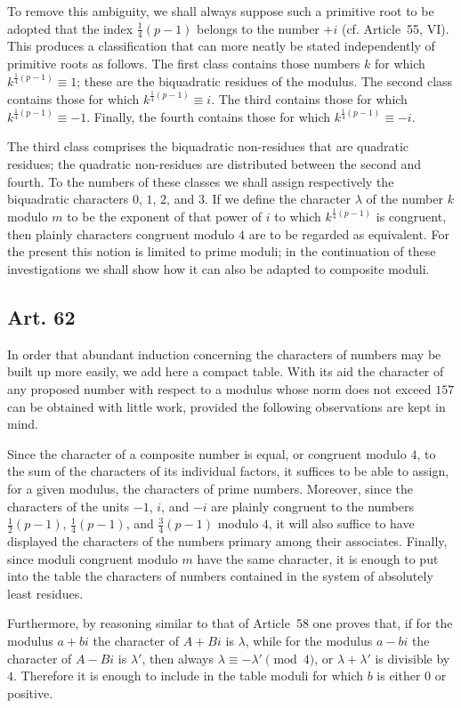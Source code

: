 \documentclass[12pt]{article}
\newcommand{\art}[1]{\subsection*{Art. #1}}
\begin{document}
To remove this ambiguity, we shall always suppose such a primitive root to be adopted that the index $\frac14(p-1)$ belongs to the number $+i$ (cf. Article~55, VI). This produces a classification that can more neatly be stated independently of primitive roots as follows. The first class contains those numbers $k$ for which $k^{\frac14(p-1)}\equiv1$; these are the biquadratic residues of the modulus. The second class contains those for which $k^{\frac14(p-1)}\equiv i$. The third contains those for which $k^{\frac14(p-1)}\equiv-1$. Finally, the fourth contains those for which $k^{\frac14(p-1)}\equiv-i$.

The third class comprises the biquadratic non-residues that are quadratic residues; the quadratic non-residues are distributed between the second and fourth. To the numbers of these classes we shall assign respectively the biquadratic characters $0$, $1$, $2$, and $3$. If we define the character $\lambda$ of the number $k$ modulo $m$ to be the exponent of that power of $i$ to which $k^{\frac14(p-1)}$ is congruent, then plainly characters congruent modulo $4$ are to be regarded as equivalent. For the present this notion is limited to prime moduli; in the continuation of these investigations we shall show how it can also be adapted to composite moduli.

\art{62}
In order that abundant induction concerning the characters of numbers may be built up more easily, we add here a compact table. With its aid the character of any proposed number with respect to a modulus whose norm does not exceed $157$ can be obtained with little work, provided the following observations are kept in mind.

Since the character of a composite number is equal, or congruent modulo $4$, to the sum of the characters of its individual factors, it suffices to be able to assign, for a given modulus, the characters of prime numbers. Moreover, since the characters of the units $-1$, $i$, and $-i$ are plainly congruent to the numbers $\frac12(p-1)$, $\frac14(p-1)$, and $\frac34(p-1)$ modulo $4$, it will also suffice to have displayed the characters of the numbers primary among their associates. Finally, since moduli congruent modulo $m$ have the same character, it is enough to put into the table the characters of numbers contained in the system of absolutely least residues.

Furthermore, by reasoning similar to that of Article~58 one proves that, if for the modulus $a+bi$ the character of $A+Bi$ is $\lambda$, while for the modulus $a-bi$ the character of $A-Bi$ is $\lambda'$, then always $\lambda\equiv-\lambda'\pmod4$, or $\lambda+\lambda'$ is divisible by $4$. Therefore it is enough to include in the table moduli for which $b$ is either $0$ or positive.
\end{document}
